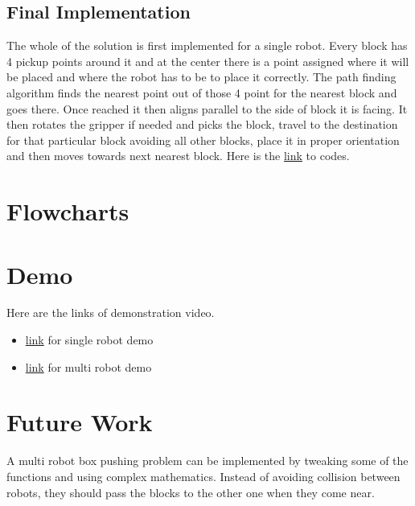\documentclass[a4paper,12pt,oneside]{book}
\begin{document}
\subsection*{Final Implementation}
The whole of the solution is first implemented for a single robot. Every block has 4 pickup points around it and at the center there is a point assigned where it will be placed and where the robot has to be to place it correctly. The path finding algorithm finds the nearest point out of those 4 point for the nearest block and goes there. Once reached it then aligns parallel to the side of block it is facing. It then rotates the gripper if needed and picks the block, travel to the destination for that particular block avoiding all other blocks, place it in proper orientation and then moves towards next nearest block. Here is the \href{https://github.com/eYSIP-2018/Jigsaw_Puzzle_Solver_using_Multiple_Robots}{link} to codes.
\section{Flowcharts}

\section{Demo}
Here are the links of demonstration video.
\begin{itemize}
\item \href{https://youtu.be/_RwL_YZDmpI}{link} for single robot demo
\item \href{https://youtu.be/jv9p9h0FJP0}{link} for multi robot demo
\end{itemize} 

\section{Future Work}
A multi robot box pushing problem can be implemented by tweaking some of the functions and using complex mathematics. Instead of avoiding collision between robots, they should pass the blocks to the other one when they come near.
\end{document}
